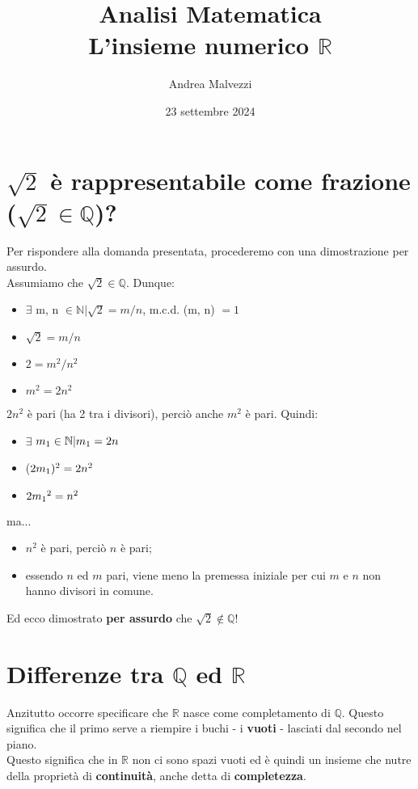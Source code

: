 \documentclass[12pt]{article}
\title{\textbf{Analisi Matematica\\L'insieme numerico $\mathbb{R}$}}
\date{23 settembre 2024}
\author{Andrea Malvezzi}
\begin{document}
\maketitle
\pagebreak
\tableofcontents
\pagebreak
\section{$\sqrt{2}$ è rappresentabile come frazione\\($\sqrt{2} \in \mathbb{Q}$)?}
Per rispondere alla domanda presentata, procederemo con una dimostrazione per assurdo.\\
Assumiamo che $\sqrt{2} \in \mathbb{Q}$. Dunque:
\begin{itemize}
    \item $\exists$ m, n $\in \mathbb{N} | \sqrt{2} = m/n$, m.c.d. (m, n) $= 1$
    \item $\sqrt{2} = m/n$
    \item $2 = m^2/n^2$
    \item $m^2 = 2n^2$ 
\end{itemize}
$2n^2$ è pari (ha 2 tra i divisori), perciò anche $m^2$ è pari. Quindi:
\begin{itemize}
    \item $\exists$ $m\textsubscript{1} \in \mathbb{N} | m\textsubscript{1} = 2n$
    \item ($2m\textsubscript{1})^2 = 2n^2$
    \item $2m\textsubscript{1}^2 = n^2$  
\end{itemize}
ma...
\begin{itemize}
    \item $n^2$ è pari, perciò $n$ è pari;
    \item essendo $n$ ed $m$ pari, viene meno la premessa iniziale per cui $m$ e $n$ non hanno divisori in comune.
\end{itemize}
Ed ecco dimostrato \textbf{per assurdo} che $\sqrt{2} \notin \mathbb{Q}$!
\section{Differenze tra $\mathbb{Q}$ ed $\mathbb{R}$}
Anzitutto occorre specificare che $\mathbb{R}$ nasce come completamento di $\mathbb{Q}$. Questo significa che il primo serve a riempire i buchi - i \textbf{vuoti} - lasciati dal secondo nel piano.\\
Questo significa che in $\mathbb{R}$ non ci sono spazi vuoti ed è quindi un insieme che nutre della proprietà di \textbf{continuità}, anche detta di \textbf{completezza}.
\end{document}
